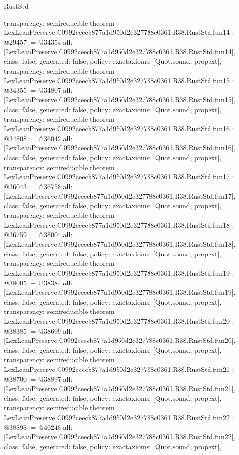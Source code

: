 \begin{lexlean}{RustStd}
\begin{coremodule}
{  transparency: semireducible
}
theorem LexLeanPreserve.C0992ceecb877a1d950d2e327788c0361.R38.RustStd.fun14 : @29457 := @34354 {
  all: [LexLeanPreserve.C0992ceecb877a1d950d2e327788c0361.R38.RustStd.fun14],
  class: false,
  generated: false,
  policy: exact{axioms: [Quot.sound, propext]},
  transparency: semireducible
}
theorem LexLeanPreserve.C0992ceecb877a1d950d2e327788c0361.R38.RustStd.fun15 : @34355 := @34807 {
  all: [LexLeanPreserve.C0992ceecb877a1d950d2e327788c0361.R38.RustStd.fun15],
  class: false,
  generated: false,
  policy: exact{axioms: [Quot.sound, propext]},
  transparency: semireducible
}
theorem LexLeanPreserve.C0992ceecb877a1d950d2e327788c0361.R38.RustStd.fun16 : @34808 := @36042 {
  all: [LexLeanPreserve.C0992ceecb877a1d950d2e327788c0361.R38.RustStd.fun16],
  class: false,
  generated: false,
  policy: exact{axioms: [Quot.sound, propext]},
  transparency: semireducible
}
theorem LexLeanPreserve.C0992ceecb877a1d950d2e327788c0361.R38.RustStd.fun17 : @36043 := @36758 {
  all: [LexLeanPreserve.C0992ceecb877a1d950d2e327788c0361.R38.RustStd.fun17],
  class: false,
  generated: false,
  policy: exact{axioms: [Quot.sound, propext]},
  transparency: semireducible
}
theorem LexLeanPreserve.C0992ceecb877a1d950d2e327788c0361.R38.RustStd.fun18 : @36759 := @38004 {
  all: [LexLeanPreserve.C0992ceecb877a1d950d2e327788c0361.R38.RustStd.fun18],
  class: false,
  generated: false,
  policy: exact{axioms: [Quot.sound, propext]},
  transparency: semireducible
}
theorem LexLeanPreserve.C0992ceecb877a1d950d2e327788c0361.R38.RustStd.fun19 : @38005 := @38384 {
  all: [LexLeanPreserve.C0992ceecb877a1d950d2e327788c0361.R38.RustStd.fun19],
  class: false,
  generated: false,
  policy: exact{axioms: [Quot.sound, propext]},
  transparency: semireducible
}
theorem LexLeanPreserve.C0992ceecb877a1d950d2e327788c0361.R38.RustStd.fun20 : @38385 := @38699 {
  all: [LexLeanPreserve.C0992ceecb877a1d950d2e327788c0361.R38.RustStd.fun20],
  class: false,
  generated: false,
  policy: exact{axioms: [Quot.sound, propext]},
  transparency: semireducible
}
theorem LexLeanPreserve.C0992ceecb877a1d950d2e327788c0361.R38.RustStd.fun21 : @38700 := @38897 {
  all: [LexLeanPreserve.C0992ceecb877a1d950d2e327788c0361.R38.RustStd.fun21],
  class: false,
  generated: false,
  policy: exact{axioms: [Quot.sound, propext]},
  transparency: semireducible
}
theorem LexLeanPreserve.C0992ceecb877a1d950d2e327788c0361.R38.RustStd.fun22 : @38898 := @40248 {
  all: [LexLeanPreserve.C0992ceecb877a1d950d2e327788c0361.R38.RustStd.fun22],
  class: false,
  generated: false,
  policy: exact{axioms: [Quot.sound, propext]},
}
\end{coremodule}
\end{lexlean}
